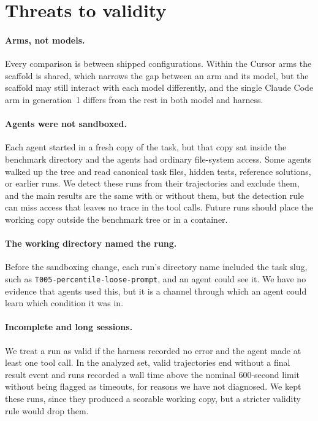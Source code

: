 \section{Threats to validity}
\label{sec:limits}

\paragraph{Arms, not models.} Every comparison is between shipped
configurations. Within the Cursor arms the scaffold is shared, which narrows
the gap between an arm and its model, but the scaffold may still interact
with each model differently, and the single Claude Code arm in generation~1
differs from the rest in both model and harness.

\paragraph{Agents were not sandboxed.} Each agent started in a fresh copy of
the task, but that copy sat inside the benchmark directory and the agents
had ordinary file-system access. Some agents walked up the tree and read
canonical task files, hidden tests, reference solutions, or earlier runs. We
detect these runs from their trajectories and exclude them, and the main
results are the same with or without them, but the detection rule can miss
access that leaves no trace in the tool calls. Future runs should place the
working copy outside the benchmark tree or in a container.

\paragraph{The working directory named the rung.} Before the sandboxing
change, each run's directory name included the task slug, such as
\texttt{T005-percentile-loose-prompt}, and an agent could see it. We have no
evidence that agents used this, but it is a channel through which an agent
could learn which condition it was in.

\paragraph{Incomplete and long sessions.} We treat a run as valid if the
harness recorded no error and the agent made at least one tool call. In the
analyzed set, \XIncomplete{} valid trajectories end without a final result
event and \XOverTime{} runs recorded a wall time above the nominal 600-second limit
without being flagged as timeouts, for reasons we have not diagnosed. We kept these runs, since they produced a scorable working
copy, but a stricter validity rule would drop them.


